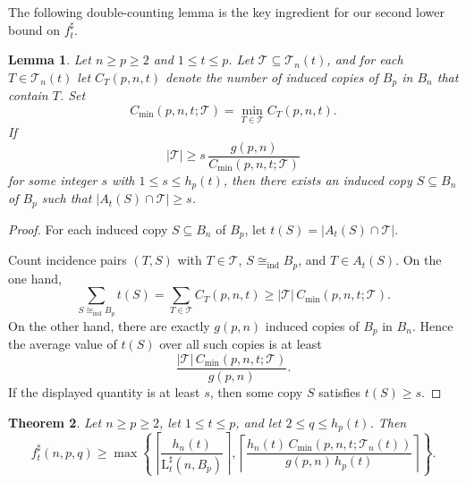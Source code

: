 \documentclass[twoside,12pt]{article}
\newcommand{\ceil}[1]{\left\lceil #1 \right\rceil}
\newtheorem{theorem}{Theorem}[section]
\newtheorem{lemma}[theorem]{Lemma}
\newcommand{\ind}{\mathrm{ind}}
\newcommand{\LT}{\mathrm{L}}
\begin{document}
The following double-counting lemma is the key ingredient for our second lower bound on \(f_t^\sharp\).

\begin{lemma}\label{lem-corrected-tchain-concentration}
Let $n\ge p\ge2$ and $1\le t\le p$. Let $\mathcal T\subseteq \mathcal T_n(t)$, and for each $T\in \mathcal T_n(t)$ let $C_T(p,n,t)$ denote the number of induced copies of $B_p$ in $B_n$ that contain $T$. Set
\[
C_{\min}(p,n,t;\mathcal T)=\min_{T\in \mathcal T} C_T(p,n,t).
\]
If
\[
|\mathcal T|
\ge
s\,\frac{g(p,n)}{C_{\min}(p,n,t;\mathcal T)}
\]
for some integer $s$ with $1\le s\le h_p(t)$, then there exists an induced copy $S\subseteq B_n$ of $B_p$ such that
$|A_t(S)\cap \mathcal T|\ge s$.
\end{lemma}

\begin{proof}
For each induced copy $S\subseteq B_n$ of $B_p$, let $t(S)=|A_t(S)\cap \mathcal T|$.

Count incidence pairs $(T,S)$ with $T\in\mathcal T$, \(S\cong_{\ind} B_p\), and \(T\in A_t(S)\). On the one hand,
\[
\sum_{S\cong_{\ind} B_p} t(S)
=
\sum_{T\in\mathcal T} C_T(p,n,t)
\ge
|\mathcal T|\,C_{\min}(p,n,t;\mathcal T).
\]
On the other hand, there are exactly \(g(p,n)\) induced copies of \(B_p\) in \(B_n\). Hence the average value of \(t(S)\) over all such copies is at least
\[
\frac{|\mathcal T|\,C_{\min}(p,n,t;\mathcal T)}{g(p,n)}.
\]
If the displayed quantity is at least \(s\), then some copy \(S\) satisfies \(t(S)\ge s\).
\end{proof}

\begin{theorem}\label{th:ftsharp-lower-bound-ultimate-rigorous}
Let $n\ge p\ge2$, let $1\le t\le p$, and let $2\le q\le h_p(t)$. Then
\[
f_t^\sharp(n,p,q)
\ge
\max\left\{
\ceil{\frac{h_n(t)}{\LT_t^\sharp(n,B_p)}},
\ceil{\frac{h_n(t)\,C_{\min}(p,n,t;\mathcal T_n(t))}{g(p,n)\,h_p(t)}}
\right\}.
\]
\end{theorem}
\end{document}
